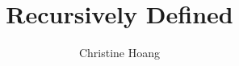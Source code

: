 \documentclass{article}
\title{Recursively Defined}
\author{Christine Hoang}
\begin{document}
\maketitle

\section{}
\end{document}
